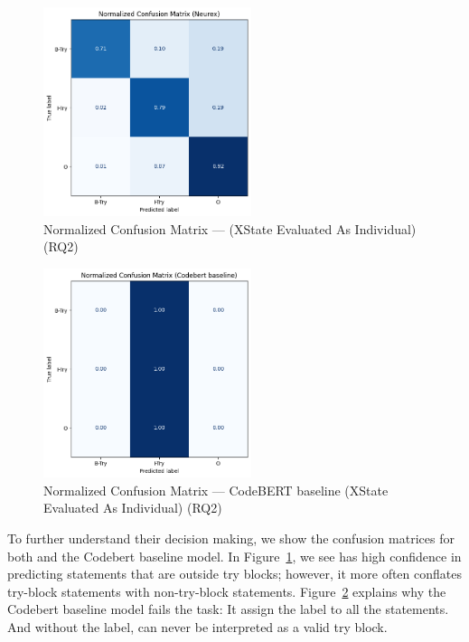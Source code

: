 \begin{figure}[t]
 	\centering
 	\includegraphics[width=2.4in]{rq2_cm_neurex.png}
        \vspace{-10pt}
 	\caption{Normalized Confusion Matrix --- {\tool} (XState Evaluated As Individual) (RQ2)}
 	\label{fig:rq2-cm-xstate}	
\end{figure}

\begin{figure}[t]
 	\centering
 	\includegraphics[width=2.4in]{rq2_cm_codebert.png}
        \vspace{-10pt}
 	\caption{Normalized Confusion Matrix --- CodeBERT baseline (XState Evaluated As Individual) (RQ2)}
 	\label{fig:rq2-cm-codebert}	
\end{figure}

To further understand their decision making, we show the confusion matrices for both {\xstate} and the Codebert baseline model. In Figure~\ref{fig:rq2-cm-xstate}, we see {\xstate} has high confidence in predicting statements that are outside try blocks; however, it more often conflates try-block statements with non-try-block statements. Figure~\ref{fig:rq2-cm-codebert} explains why the Codebert baseline model fails the task: It assign the  label to all the statements. And without the  label,  can never be interpreted as a valid try block.